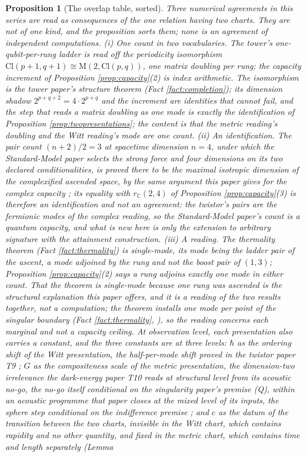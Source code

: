 \documentclass[11pt]{article}
\newtheorem{proposition}[theorem]{Proposition}
\theoremstyle{definition}
\newcommand{\Cl}{\mathrm{Cl}}
\newcommand{\C}{\mathbb{C}}
\newcommand{\Mat}{\mathrm{M}}
\begin{document}
\begin{proposition}[The overlap table, sorted]\label{prop:overlap}
Three numerical agreements in this series are read as consequences of the one relation having two charts. They are not of one kind, and the proposition sorts them; none is an agreement of independent computations. \emph{(i) One count in two vocabularies.} The tower's one-qubit-per-rung ladder is read off the periodicity isomorphism $\Cl(p+1,q+1) \cong \Mat(2, \Cl(p,q))$, one matrix doubling per rung; the capacity increment of Proposition \ref{prop:capacity}(2) is index arithmetic. The isomorphism is the tower paper's structure theorem (Fact \ref{fact:completion}); its dimension shadow $2^{p+q+2} = 4 \cdot 2^{p+q}$ and the increment are identities that cannot fail, and the step that reads a matrix doubling as one mode is exactly the identification of Proposition \ref{prop:twopresentations}; the content is that the metric reading's doubling and the Witt reading's mode are one count. \emph{(ii) An identification.} The pair count $(n+2)/2 = 3$ at spacetime dimension $n = 4$, under which the Standard-Model paper selects the strong force and four dimensions on its two declared conditionalities, is proved there to be the maximal isotropic dimension of the complexified ascended space, by the same argument this paper gives for the complex capacity \cite[Lem.~2.12]{ButlerT12}; its equality with $r_{\C}(2,4)$ of Proposition \ref{prop:capacity}(3) is therefore an identification and not an agreement: the twistor's pairs are the fermionic modes of the complex reading, so the Standard-Model paper's count is a quantum capacity, and what is new here is only the extension to arbitrary signature with the attainment construction. \emph{(iii) A reading.} The thermality theorem (Fact \ref{fact:thermality}) is single-mode, its mode being the ladder pair of the ascent, a mode adjoined by the rung and not the boost pair of $(1,3)$; Proposition \ref{prop:capacity}(2) says a rung adjoins exactly one mode in either count. That the theorem is single-mode \emph{because} one rung was ascended is the structural explanation this paper offers, and it is a reading of the two results together, not a computation; the theorem installs one mode per point of the singular boundary (Fact \ref{fact:thermality}, \cite[Thm.~8.12]{ButlerT4}), so the reading concerns each marginal and not a capacity ceiling. At observation level, each presentation also carries a constant, and the three constants are at three levels: $\hbar$ as the ordering shift of the Witt presentation, the half-per-mode shift proved in the twistor paper T9 \cite[Prop.~5.6]{ButlerT9}; $G$ as the compositeness scale of the metric presentation, the dimension-two irrelevance the dark-energy paper T10 reads at structural level from its acoustic no-go, the no-go itself conditional on the singularity paper's premise (Q), within an acoustic programme that paper closes at the mixed level of its inputs, the sphere step conditional on the indifference premise \cite[Prop.~5.2, Rem.~5.3, Assembly~5.5]{ButlerT10}; and $c$ as the datum of the transition between the two charts, invisible in the Witt chart, which contains rapidity and no other quantity, and fixed in the metric chart, which contains time and length separately (Lemma 
\end{proposition}
\end{document}
